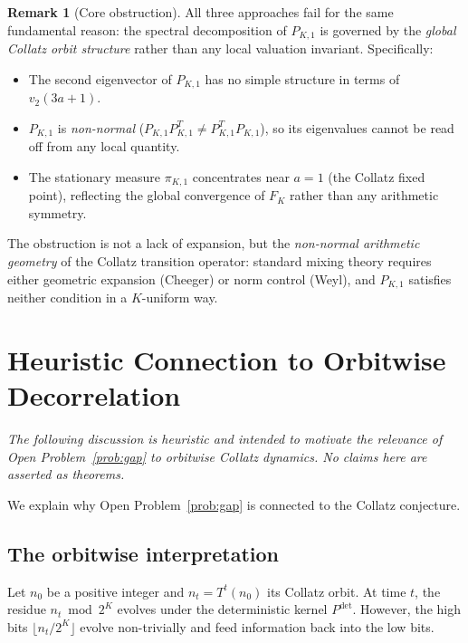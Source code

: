 \documentclass[12pt]{article}
\theoremstyle{definition}
\newtheorem{remark}[theorem]{Remark}
\newcommand{\vt}{v_2}
\newcommand{\PKone}{P_{K,1}}
\begin{document}
\begin{remark}[Core obstruction]
All three approaches fail for the same fundamental reason: the spectral decomposition of $\PKone$ is governed by the \emph{global Collatz orbit structure} rather than any local valuation invariant. Specifically:
\begin{itemize}
\item The second eigenvector of $\PKone$ has no simple structure in terms of $\vt(3a+1)$.
\item $\PKone$ is \emph{non-normal} ($\PKone \PKone^T \neq \PKone^T \PKone$), so its eigenvalues cannot be read off from any local quantity.
\item The stationary measure $\pi_{K,1}$ concentrates near $a=1$ (the Collatz fixed point), reflecting the global convergence of $F_K$ rather than any arithmetic symmetry.
\end{itemize}

The obstruction is not a lack of expansion, but the \emph{non-normal arithmetic geometry} of the Collatz transition operator: standard mixing theory requires either geometric expansion (Cheeger) or norm control (Weyl), and $\PKone$ satisfies neither condition in a $K$-uniform way.
\end{remark}

\section{Heuristic Connection to Orbitwise Decorrelation}
\label{sec:collatz}

\emph{The following discussion is heuristic and intended to motivate the relevance of Open Problem~\ref{prob:gap} to orbitwise Collatz dynamics. No claims here are asserted as theorems.}

We explain why Open Problem~\ref{prob:gap} is connected to the Collatz conjecture.

\subsection{The orbitwise interpretation}

Let $n_0$ be a positive integer and $n_t = T^t(n_0)$ its Collatz orbit. At time $t$, the residue $n_t \bmod 2^K$ evolves under the deterministic kernel $P^{\mathrm{det}}$. However, the high bits $\lfloor n_t / 2^K \rfloor$ evolve non-trivially and feed information back into the low bits.
\end{document}
